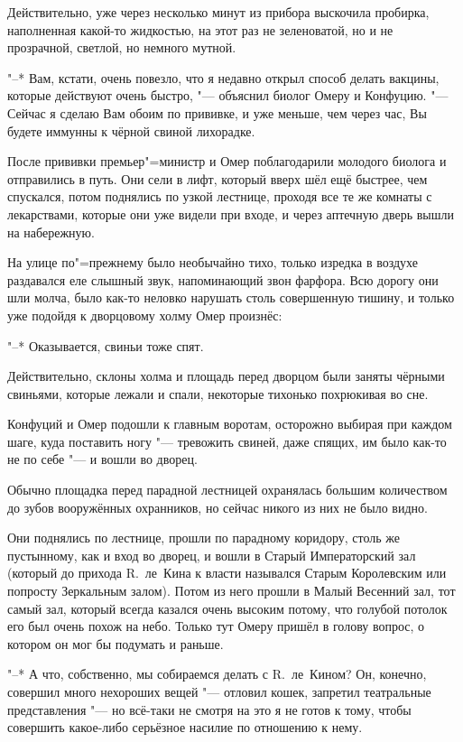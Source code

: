 Действительно, уже через несколько минут из прибора выскочила пробирка,
наполненная какой-то жидкостью, на этот раз не зеленоватой, но и не прозрачной,
светлой, но немного мутной.

"--* Вам, кстати, очень повезло, что я недавно открыл способ делать вакцины,
которые действуют очень быстро, "--- объяснил биолог Омеру и Конфуцию.
"--- Сейчас я сделаю Вам обоим по прививке, и уже меньше, чем через час, Вы
будете иммунны к чёрной свиной лихорадке.

После прививки премьер"=министр и Омер поблагодарили молодого биолога и
отправились в путь.
Они сели в лифт, который вверх шёл ещё быстрее, чем спускался, потом поднялись
по узкой лестнице, проходя все те же комнаты с лекарствами, которые они уже
видели при входе, и через аптечную дверь вышли на набережную.

На улице по"=прежнему было необычайно тихо, только изредка в воздухе раздавался
еле слышный звук, напоминающий звон фарфора.
Всю дорогу они шли молча, было как-то неловко нарушать столь совершенную тишину,
и только уже подойдя к дворцовому холму Омер произнёс:

"--* Оказывается, свиньи тоже спят.

Действительно, склоны холма и площадь перед дворцом были заняты чёрными
свиньями, которые лежали и спали, некоторые тихонько похрюкивая во сне.

Конфуций и Омер подошли к главным воротам, осторожно выбирая при каждом шаге,
куда поставить ногу "--- тревожить свиней, даже спящих, им было как-то не по
себе "--- и вошли во дворец.

Обычно площадка перед парадной лестницей охранялась большим количеством до зубов
вооружённых охранников, но сейчас никого из них не было видно.

Они поднялись по лестнице, прошли по парадному коридору, столь же пустынному,
как и вход во дворец, и вошли в Старый Императорский зал (который до прихода
R.~ле~Кина к власти назывался Старым Королевским или попросту Зеркальным залом).
Потом из него прошли в Малый Весенний зал, тот самый зал, который всегда казался
очень высоким потому, что голубой потолок его был очень похож на небо.
Только тут Омеру пришёл в голову вопрос, о котором он мог бы подумать и раньше.

"--* А что, собственно, мы собираемся делать с R.~ле~Кином?
Он, конечно, совершил много нехороших вещей "--- отловил кошек, запретил
театральные представления "--- но всё-таки не смотря на это я не готов к тому,
чтобы совершить какое-либо серьёзное насилие по отношению к нему.

